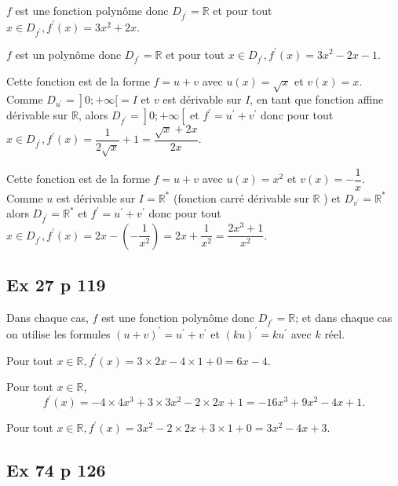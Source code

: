 \documentclass[12pt,a5paper]{book}
\begin{document}
\begin{enumMet}
    \item $f$ est une fonction polynôme donc $D_{f^{\prime}}=\mathbb{R}$ et pour tout $x \in D_{f^{\prime}}, f^{\prime}(x)=3 x^{2}+2 x$.
    \item  $f$ est un polynôme donc $D_{f^{\prime}}=\mathbb{R}$ et pour tout $x \in D_{f^{\prime}}, f^{\prime}(x)=3 x^{2}-2 x-1$.
    \item Cette fonction est de la forme $f=u+v$ avec $u(x)=\sqrt{x}$ et $v(x)=x$. Comme $\left.D_{u^{\prime}}=\right] 0 ;+\infty[=I$ et $v$ est dérivable sur $I$, en tant que fonction affine dérivable sur $\mathbb{R}$, alors $\left.D_{f^{\prime}}=\right] 0 ;+\infty\left[\right.$ et $f^{\prime}=u^{\prime}+v^{\prime}$ donc pour tout $x \in D_{f^{\prime}}, f^{\prime}(x)=\dfrac{1}{2 \sqrt{x}}+1=\dfrac{\sqrt{x}+2 x}{2 x} .$
    \item  Cette fonction est de la forme $f=u+v$ avec $u(x)=x^{2}$ et $v(x)=-\dfrac{1}{x}$. Comme $u$ est dérivable sur $I=\mathbb{R}^{*}$ (fonction carré dérivable sur $\mathbb{R}$ ) et $D_{v^{\prime}}=\mathbb{R}^{*}$ alors $D_{f^{\prime}}=\mathbb{R}^{*}$ et $f^{\prime}=u^{\prime}+v^{\prime}$ donc pour tout $x \in D_{f^{\prime}}, f^{\prime}(x)=2 x-\left(-\dfrac{1}{x^{2}}\right)=2 x+\dfrac{1}{x^{2}}=\dfrac{2 x^{3}+1}{x^{2}} .$
\end{enumMet}

\newpage
\subsection*{Ex 27 p 119}
Dans chaque cas, $f$ est une fonction polynôme donc $D_{f^{\prime}}=\mathbb{R}$; et dans chaque cas on utilise les formules $(u+v)^{\prime}=u^{\prime}+v^{\prime}$ et $(k u)^{\prime}=k u^{\prime}$ avec $k$ réel.
\begin{enumMet}
    \item Pour tout $x \in \mathbb{R}, f^{\prime}(x)=3 \times 2 x-4 \times 1+0=6 x-4$.
    \item Pour tout $x \in \mathbb{R}$,
    $$
    f^{\prime}(x)=-4 \times 4 x^{3}+3 \times 3 x^{2}-2 \times 2 x+1=-16 x^{3}+9 x^{2}-4 x+1 .
    $$
    \item Pour tout $x \in \mathbb{R}, f^{\prime}(x)=3 x^{2}-2 \times 2 x+3 \times 1+0=3 x^{2}-4 x+3$.
\end{enumMet}

\subsection*{Ex 74 p 126}
\end{document}
